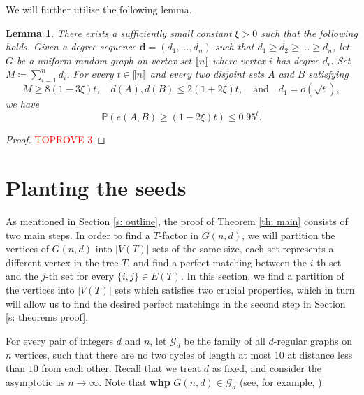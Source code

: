 \documentclass[notitlepage]{scrartcl}
\newcommand{\br}[1]{\llbracket{#1}\rrbracket}
\newtheorem{lemma}[thm]{Lemma}
\renewcommand{\Pr}{\mathbb{P}}
\begin{document}
We will further utilise the following lemma.
\begin{lemma}\label{lemma:Gao-usage}
    There exists a sufficiently small constant $\xi>0$ such that the following holds. Given a degree sequence $\mathbf{d} = (d_1, \dots, d_n)$ such that $d_1 \ge d_2 \ge \dots \ge d_n$, let $G$ be a uniform random graph on vertex set $\br{n}$ where vertex $i$ has degree $d_i$. Set $M \coloneqq \sum_{i=1}^{n} d_i$. For every $t\in \br{n}$ and every two disjoint sets $A$ and $B$ satisfying
    \[
        M \ge 8(1-3\xi)t, \quad d(A), d(B) \le 2(1+2\xi)t, \quad \text{and} \quad d_1=o\left(\sqrt{t}\right),
    \]
    we have
    \[
        \Pr\left(e(A, B) \ge (1-2\xi)t\right) \le 0.95^{t}.
    \]
\end{lemma}
\begin{proof}\textcolor{red}{TOPROVE 3}\end{proof}

\section{Planting the seeds}\label{s: proposition}
As mentioned in Section \ref{s: outline}, the proof of Theorem \ref{th: main} consists of two main steps. In order to find a $T$-factor in $G(n, d)$, we will partition the vertices of $G(n, d)$ into $|V(T)|$ sets of the same size, each set represents a different vertex in the tree $T$, and find a perfect matching between the $i$-th set and the $j$-th set for every $\{i, j\} \in E(T)$. In this section, we find a partition of the vertices into $|V(T)|$ sets which satisfies two crucial properties, which in turn will allow us to find the desired perfect matchings in the second step in Section \ref{s: theorems proof}.


For every pair of integers $d$ and $n$, let $\mathcal{G}_d$ be the family of all $d$-regular graphs on $n$ vertices, such that there are no two cycles of length at most $10$ at distance less than $10$ from each other. Recall that we treat $d$ as fixed, and consider the asymptotic as $n\to\infty$. Note that \textbf{whp} $G(n,d)\in \mathcal{G}_d$ (see, for example, \cite{W99}). 
\end{document}
